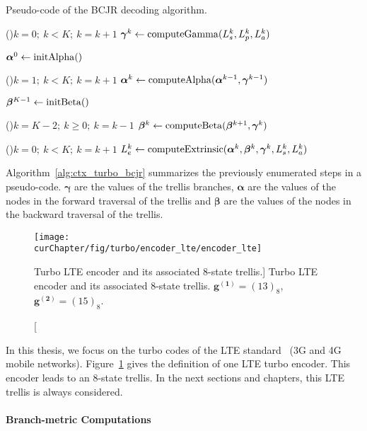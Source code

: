 \begin{algorithm}
  \caption{Pseudo-code of the BCJR decoding algorithm.}
  \label{alg:ctx_turbo_bcjr}

  \For(){$k=0;~k<K;~k=k+1$}
  {
    $\boldsymbol{\gamma}^k\gets \operatorname*{computeGamma}(L_{s}^k, L_{p}^k, L_{a}^k)$
  }

  $\boldsymbol{\alpha}^0\gets \operatorname*{initAlpha}()$

  \For(){$k=1;~k<K;~k=k+1$}
  {
    $\boldsymbol{\alpha}^k\gets \operatorname*{computeAlpha}(\boldsymbol{\alpha}^{k-1}, \boldsymbol{\gamma}^{k-1})$
  }

  $\boldsymbol{\beta}^{K-1}\gets \operatorname*{initBeta}()$

  \For(){$k=K-2;~k \geq 0;~k=k-1$}
  {
    $\boldsymbol{\beta}^k\gets \operatorname*{computeBeta}(\boldsymbol{\beta}^{k+1}, \boldsymbol{\gamma}^{k})$
  }

  \For(){$k=0;~k<K;~k=k+1$}
  {
    $L_e^k\gets \operatorname*{computeExtrinsic}(\boldsymbol{\alpha}^k, \boldsymbol{\beta}^{k}, \boldsymbol{\gamma}^{k}, L_{s}^k, L_{a}^k)$
  }
\end{algorithm}

Algorithm~\ref{alg:ctx_turbo_bcjr} summarizes the previously enumerated steps in
a pseudo-code. $\bm{\gamma}$ are the values of the trellis branches,
$\bm{\alpha}$ are the values of the nodes in the forward traversal of the
trellis and $\bm{\beta}$ are the values of the nodes in the backward traversal
of the trellis.

\begin{figure}[htp]
  \centering
  \texttt{[image: \\curChapter/fig/turbo/encoder\_lte/encoder\_lte]}
  \caption
    [Turbo LTE encoder and its associated 8-state trellis.]
    {Turbo LTE encoder and its associated 8-state trellis.
     $\bm{g^{(1)}} = (13)_8$, $\bm{g^{(2)}} = (15)_8$.}
  \label{fig:ctx_turbo_encoder_lte}
\end{figure}

In this thesis, we focus on the turbo codes of the LTE standard~\cite{ETSI2013}
(3G and 4G mobile networks). Figure~\ref{fig:ctx_turbo_encoder_lte} gives the
definition of one LTE turbo encoder. This encoder leads to an 8-state trellis.
In the next sections and chapters, this LTE trellis is always considered.

\paragraph{Branch-metric Computations}

